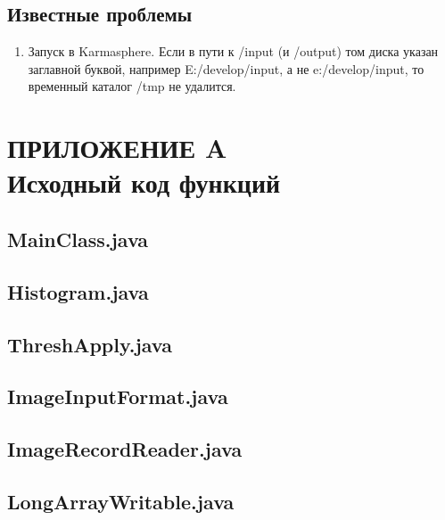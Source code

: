 \documentclass[12pt,a4paper]{extarticle} %
\begin{document}
\subsection{Известные проблемы}
\begin{enumerate}
    \item Запуск в Karmasphere. Если в пути к /input (и /output) том диска указан заглавной буквой, например E:/develop/input, а не e:/develop/input, то временный каталог /tmp не удалится.
\end{enumerate}


\newpage\clearpage
\section*{ПРИЛОЖЕНИЕ A\\ Исходный код функций}
\label{inc:source}
\small
\sloppy
\subsection*{MainClass.java}

\subsection*{Histogram.java}

\subsection*{ThreshApply.java}

\subsection*{ImageInputFormat.java}

\subsection*{ImageRecordReader.java}

\subsection*{LongArrayWritable.java}

\end{document}
